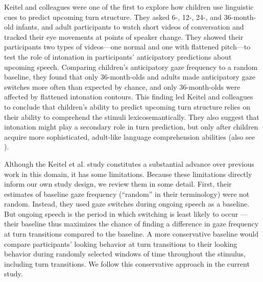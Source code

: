 \documentclass[authoryear, 12pt]{elsarticle}
\begin{document}


Keitel and colleagues \citeyearpar{keitel2013} were one of the first to explore how children use linguistic cues to predict upcoming turn structure. They asked 6-, 12-, 24-, and 36-month-old infants, and adult participants to watch short videos of conversation and tracked their eye movements at points of speaker change. They showed their participants two types of videos---one normal and one with flattened pitch---to test the role of intonation in participants' anticipatory predictions about upcoming speech. Comparing children's anticipatory gaze frequency to a random baseline, they found that only 36-month-olds and adults made anticipatory gaze switches more often than expected by chance, and only 36-month-olds were affected by flattened intonation contours. This finding led Keitel and colleagues to conclude that children's ability to predict upcoming turn structure relies on their ability to comprehend the stimuli lexicosemantically. They also suggest that intonation might play a secondary role in turn prediction, but only after children acquire more sophisticated, adult-like language comprehension abilities (also see \citealp{keitel2015}).

Although the Keitel et al. \citeyearpar{keitel2013} study constitutes a substantial advance over previous work in this domain, it has some limitations. Because these limitations directly inform our own study design, we review them in some detail. First, their estimates of baseline gaze frequency (``random'' in their terminology) were not random. Instead, they used gaze switches during ongoing speech as a baseline. But ongoing speech is the period in which switching is least likely to occur \citep{hirvenkari2013}---their baseline thus maximizes the chance of finding a difference in gaze frequency at turn transitions compared to the baseline. A more conservative baseline would compare participants' looking behavior at turn transitions to their looking behavior during randomly selected windows of time throughout the stimulus, including turn transitions. We follow this conservative approach in the current study. 
\end{document}
